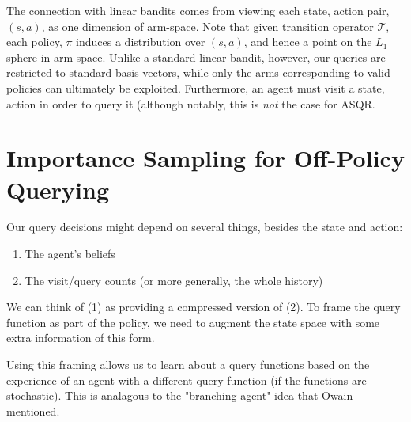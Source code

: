 \documentclass{article}
\begin{document}
The connection with linear bandits comes from viewing each state, action pair, $(s,a)$, as one dimension of arm-space.
Note that given transition operator $\mathcal{T}$, each policy, $\pi$ induces a distribution over $(s,a)$, and hence a point on the $L_1$ sphere in arm-space.
Unlike a standard linear bandit, however, our queries are restricted to standard basis vectors, while only the arms corresponding to valid policies can ultimately be exploited.
Furthermore, an agent must visit a state, action in order to query it (although notably, this is \emph{not} the case for ASQR.




\section{Importance Sampling for Off-Policy Querying}
Our query decisions might depend on several things, besides the state and action:
\begin{enumerate}
\item The agent's beliefs
\item The visit/query counts (or more generally, the whole history)
\end{enumerate}

We can think of (1) as providing a compressed version of (2).  
To frame the query function as part of the policy, we need to augment the state space with some extra information of this form.

Using this framing allows us to learn about a query functions based on the experience of an agent with a different query function (if the functions are stochastic).
This is analagous to the "branching agent" idea that Owain mentioned.





%

\end{document}

